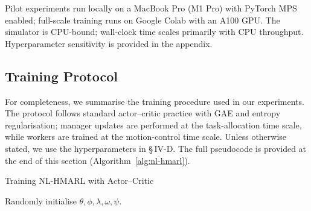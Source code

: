 \documentclass[journal,onecolumn]{IEEEtran}
\begin{document}
Pilot experiments run locally on a MacBook Pro (M1 Pro) with PyTorch MPS enabled; full-scale training runs on Google Colab with an A100 GPU. The simulator is CPU-bound; wall-clock time scales primarily with CPU throughput. Hyperparameter sensitivity is provided in the appendix.

\subsection{Training Protocol}
For completeness, we summarise the training procedure used in our experiments. The protocol follows standard actor--critic practice with GAE and entropy regularisation; manager updates are performed at the task-allocation time scale, while workers are trained at the motion-control time scale. Unless otherwise stated, we use the hyperparameters in \S\,IV-D. The full pseudocode is provided at the end of this section (Algorithm~\ref{alg:nl-hmarl}).

\begin{algorithm}[!htbp]
  \caption{Training NL-HMARL with Actor--Critic}
  \label{alg:nl-hmarl}
  \DontPrintSemicolon
  \BlankLine
  Randomly initialise \(\theta,\phi,\lambda,\omega,\psi\).\;
\end{algorithm}



\end{document}
